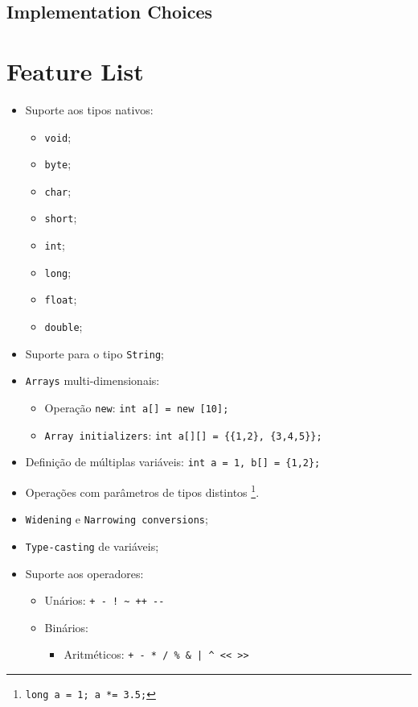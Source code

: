 \documentclass[a4paper]{article}
\begin{document}
\subsection{Implementation Choices}
\indent \indent %

\cleardoublepage

\section{Feature List}
\begin{itemize}
	\item Suporte aos tipos nativos:
	\begin{itemize}
		\item \texttt{void};
		\item \texttt{byte};
		\item \texttt{char};
		\item \texttt{short};
		\item \texttt{int};
		\item \texttt{long};
		\item \texttt{float};
		\item \texttt{double};
	\end{itemize}
	\item Suporte para o tipo \texttt{String};%
	\item \texttt{Arrays} multi-dimensionais:
	\begin{itemize}
		\item Operação \texttt{new}: \quad \texttt{int a[] = new [10];}
		\item \texttt{Array initializers}: \quad \texttt{int a[][] = \{\{1,2\}, \{3,4,5\}\}; }
	\end{itemize}
	\item Definição de múltiplas variáveis: \quad \texttt{int a = 1, b[] = \{1,2\}; }
	\item Operações com parâmetros de tipos distintos \footnote[1]{\texttt{long a = 1; a *= 3.5;}}.
	\item \texttt{Widening} e \texttt{Narrowing conversions};
	\item \texttt{Type-casting} de variáveis;
	\item Suporte aos operadores:
	\begin{itemize}
		\item Unários: \quad \verb|+ - ! ~ ++ --|
		\item Binários:
		\begin{itemize}
			\item Aritméticos: \quad \verb!+ - * / % & | ^ << >>!

\end{itemize}
\end{itemize}
\end{itemize}
\end{document}
